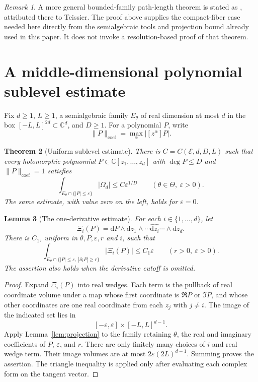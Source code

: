 \documentclass[11pt]{article}
\numberwithin{equation}{section}
\newtheorem{theorem}{Theorem}[section]
\newtheorem{lemma}[theorem]{Lemma}
\theoremstyle{definition}
\theoremstyle{remark}
\newtheorem{remark}[theorem]{Remark}
\newcommand{\C}{\mathbb C}
\newcommand{\dd}{\mathrm d}
\newcommand{\OmegaD}{\Omega_d}
\begin{document}
\begin{remark}\label{rem:connecting-paths-background}
A more general bounded-family path-length theorem is stated as
\cite[Theorem 3.3]{KOS}, attributed there to Teissier. The proof above
supplies the compact-fiber case needed here directly from the
semialgebraic tools and projection bound already used in this paper.
It does not invoke a resolution-based proof of that theorem.
\end{remark}

\section{A middle-dimensional polynomial sublevel estimate}\label{sec:sublevel}
Fix $d\ge1$, $L\ge1$, a semialgebraic family $E_\theta$ of real dimension
at most $d$ in the box $[-L,L]^{2d}\subset\C^d$, and $D\ge1$.
For a polynomial $P$, write
\[
 \|P\|_{\mathrm{coef}}=\max_\alpha|[z^\alpha]P|.
\]

\begin{theorem}[Uniform sublevel estimate]\label{thm:sublevel}
There is $C=C(\mathcal E,d,D,L)$ such that every holomorphic polynomial
$P\in\C[z_1,\ldots,z_d]$ with $\deg P\le D$ and
$\|P\|_{\mathrm{coef}}=1$ satisfies
\begin{equation}\label{eq:sublevel}
 \int_{E_\theta\cap\{|P|\le\varepsilon\}}|\OmegaD|
 \le C\varepsilon^{1/D}
 \qquad(\theta\in\Theta,\ \varepsilon>0).
\end{equation}
The same estimate, with value zero on the left, holds for
$\varepsilon=0$.
\end{theorem}

\begin{lemma}[The one-derivative estimate]\label{lem:derivative}
For each $i\in\{1,\ldots,d\}$, let
\[
 \Xi_i(P)=\dd P\wedge\dd z_1\wedge\cdots
                   \widehat{\dd z_i}\cdots\wedge\dd z_d.
\]
There is $C_1$, uniform in $\theta,P,\varepsilon,r$ and $i$, such that
\begin{equation}\label{eq:one-derivative}
 \int_{E_\theta\cap\{|P|\le\varepsilon,\ |\partial_iP|\ge r\}}
        |\Xi_i(P)|\le C_1\varepsilon
 \qquad(r>0,\ \varepsilon>0).
\end{equation}
The assertion also holds when the derivative cutoff is omitted.
\end{lemma}
\begin{proof}
Expand $\Xi_i(P)$ into real wedges. Each term is the pullback of real
coordinate volume under a map whose first coordinate is $\Re P$ or
$\Im P$, and whose other coordinates are one real coordinate from each
$z_j$ with $j\ne i$. The image of the indicated set lies in
\[
 [-\varepsilon,\varepsilon]\times[-L,L]^{d-1}.
\]
Apply Lemma~\ref{lem:projection} to the family retaining $\theta$, the
real and imaginary coefficients of $P$, $\varepsilon$, and $r$.
There are only finitely many choices of $i$ and real wedge term.
Their image volumes are at most $2\varepsilon(2L)^{d-1}$. Summing proves
the assertion. The triangle inequality is applied only after evaluating
each complex form on the tangent vector.
\end{proof}
\end{document}

